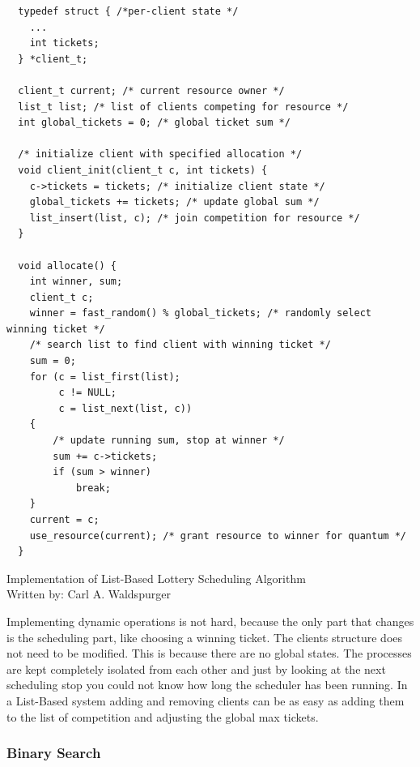 \newpage

\begin{listing}[H]
    \begin{verbatim}
  typedef struct { /*per-client state */
    ...
    int tickets;
  } *client_t;

  client_t current; /* current resource owner */
  list_t list; /* list of clients competing for resource */
  int global_tickets = 0; /* global ticket sum */

  /* initialize client with specified allocation */
  void client_init(client_t c, int tickets) {
    c->tickets = tickets; /* initialize client state */ 
    global_tickets += tickets; /* update global sum */
    list_insert(list, c); /* join competition for resource */
  }

  void allocate() {
    int winner, sum;
    client_t c;
    winner = fast_random() % global_tickets; /* randomly select winning ticket */
    /* search list to find client with winning ticket */
    sum = 0;
    for (c = list_first(list);
         c != NULL;
         c = list_next(list, c))
    {
        /* update running sum, stop at winner */
        sum += c->tickets;
        if (sum > winner)
            break;
    }
    current = c;
    use_resource(current); /* grant resource to winner for quantum */
  }
    \end{verbatim}
    \caption{Implementation of List-Based Lottery Scheduling Algorithm\\Written by: Carl A. Waldspurger~\cite{waldspurger95}}
    \label{code:lottery-sched}
\end{listing}

Implementing dynamic operations is not hard, because the only part that changes is the scheduling part, like choosing a winning ticket.
The clients structure does not need to be modified.
This is because there are no global states. The processes are kept completely isolated from each other and just by looking at the next scheduling stop you could not know how long the scheduler has been running.
In a List-Based system adding and removing clients can be as easy as adding them to the list of competition and adjusting the global max tickets.


\subsubsection{Binary Search} \label{sec:bin-sea}

